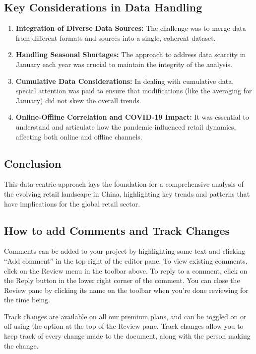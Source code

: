 \documentclass{article}
\begin{document}
\subsection*{Key Considerations in Data Handling}

\begin{enumerate}
    \item \textbf{Integration of Diverse Data Sources:} The challenge was to merge data from different formats and sources into a single, coherent dataset.
    \item \textbf{Handling Seasonal Shortages:} The approach to address data scarcity in January each year was crucial to maintain the integrity of the analysis.
    \item \textbf{Cumulative Data Considerations:} In dealing with cumulative data, special attention was paid to ensure that modifications (like the averaging for January) did not skew the overall trends.
    \item \textbf{Online-Offline Correlation and COVID-19 Impact:} It was essential to understand and articulate how the pandemic influenced retail dynamics, affecting both online and offline channels.
\end{enumerate}

\subsection*{Conclusion}

This data-centric approach lays the foundation for a comprehensive analysis of the evolving retail landscape in China, highlighting key trends and patterns that have implications for the global retail sector.




\subsection{How to add Comments and Track Changes}

Comments can be added to your project by highlighting some text and clicking ``Add comment'' in the top right of the editor pane. To view existing comments, click on the Review menu in the toolbar above. To reply to a comment, click on the Reply button in the lower right corner of the comment. You can close the Review pane by clicking its name on the toolbar when you're done reviewing for the time being.

Track changes are available on all our \href{https://www.overleaf.com/user/subscription/plans}{premium plans}, and can be toggled on or off using the option at the top of the Review pane. Track changes allow you to keep track of every change made to the document, along with the person making the change. 
\end{document}
